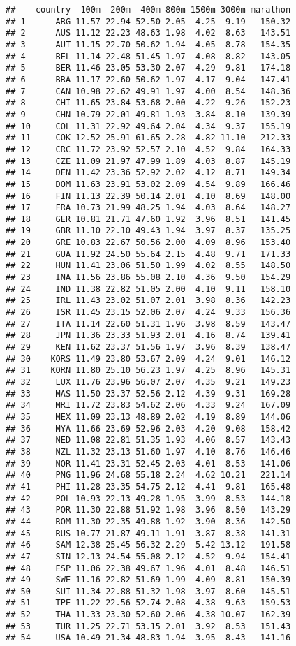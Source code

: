 \documentclass[]{article}
\begin{document}
\begin{verbatim}
##    country  100m  200m  400m 800m 1500m 3000m marathon
## 1      ARG 11.57 22.94 52.50 2.05  4.25  9.19   150.32
## 2      AUS 11.12 22.23 48.63 1.98  4.02  8.63   143.51
## 3      AUT 11.15 22.70 50.62 1.94  4.05  8.78   154.35
## 4      BEL 11.14 22.48 51.45 1.97  4.08  8.82   143.05
## 5      BER 11.46 23.05 53.30 2.07  4.29  9.81   174.18
## 6      BRA 11.17 22.60 50.62 1.97  4.17  9.04   147.41
## 7      CAN 10.98 22.62 49.91 1.97  4.00  8.54   148.36
## 8      CHI 11.65 23.84 53.68 2.00  4.22  9.26   152.23
## 9      CHN 10.79 22.01 49.81 1.93  3.84  8.10   139.39
## 10     COL 11.31 22.92 49.64 2.04  4.34  9.37   155.19
## 11     COK 12.52 25.91 61.65 2.28  4.82 11.10   212.33
## 12     CRC 11.72 23.92 52.57 2.10  4.52  9.84   164.33
## 13     CZE 11.09 21.97 47.99 1.89  4.03  8.87   145.19
## 14     DEN 11.42 23.36 52.92 2.02  4.12  8.71   149.34
## 15     DOM 11.63 23.91 53.02 2.09  4.54  9.89   166.46
## 16     FIN 11.13 22.39 50.14 2.01  4.10  8.69   148.00
## 17     FRA 10.73 21.99 48.25 1.94  4.03  8.64   148.27
## 18     GER 10.81 21.71 47.60 1.92  3.96  8.51   141.45
## 19     GBR 11.10 22.10 49.43 1.94  3.97  8.37   135.25
## 20     GRE 10.83 22.67 50.56 2.00  4.09  8.96   153.40
## 21     GUA 11.92 24.50 55.64 2.15  4.48  9.71   171.33
## 22     HUN 11.41 23.06 51.50 1.99  4.02  8.55   148.50
## 23     INA 11.56 23.86 55.08 2.10  4.36  9.50   154.29
## 24     IND 11.38 22.82 51.05 2.00  4.10  9.11   158.10
## 25     IRL 11.43 23.02 51.07 2.01  3.98  8.36   142.23
## 26     ISR 11.45 23.15 52.06 2.07  4.24  9.33   156.36
## 27     ITA 11.14 22.60 51.31 1.96  3.98  8.59   143.47
## 28     JPN 11.36 23.33 51.93 2.01  4.16  8.74   139.41
## 29     KEN 11.62 23.37 51.56 1.97  3.96  8.39   138.47
## 30    KORS 11.49 23.80 53.67 2.09  4.24  9.01   146.12
## 31    KORN 11.80 25.10 56.23 1.97  4.25  8.96   145.31
## 32     LUX 11.76 23.96 56.07 2.07  4.35  9.21   149.23
## 33     MAS 11.50 23.37 52.56 2.12  4.39  9.31   169.28
## 34     MRI 11.72 23.83 54.62 2.06  4.33  9.24   167.09
## 35     MEX 11.09 23.13 48.89 2.02  4.19  8.89   144.06
## 36     MYA 11.66 23.69 52.96 2.03  4.20  9.08   158.42
## 37     NED 11.08 22.81 51.35 1.93  4.06  8.57   143.43
## 38     NZL 11.32 23.13 51.60 1.97  4.10  8.76   146.46
## 39     NOR 11.41 23.31 52.45 2.03  4.01  8.53   141.06
## 40     PNG 11.96 24.68 55.18 2.24  4.62 10.21   221.14
## 41     PHI 11.28 23.35 54.75 2.12  4.41  9.81   165.48
## 42     POL 10.93 22.13 49.28 1.95  3.99  8.53   144.18
## 43     POR 11.30 22.88 51.92 1.98  3.96  8.50   143.29
## 44     ROM 11.30 22.35 49.88 1.92  3.90  8.36   142.50
## 45     RUS 10.77 21.87 49.11 1.91  3.87  8.38   141.31
## 46     SAM 12.38 25.45 56.32 2.29  5.42 13.12   191.58
## 47     SIN 12.13 24.54 55.08 2.12  4.52  9.94   154.41
## 48     ESP 11.06 22.38 49.67 1.96  4.01  8.48   146.51
## 49     SWE 11.16 22.82 51.69 1.99  4.09  8.81   150.39
## 50     SUI 11.34 22.88 51.32 1.98  3.97  8.60   145.51
## 51     TPE 11.22 22.56 52.74 2.08  4.38  9.63   159.53
## 52     THA 11.33 23.30 52.60 2.06  4.38 10.07   162.39
## 53     TUR 11.25 22.71 53.15 2.01  3.92  8.53   151.43
## 54     USA 10.49 21.34 48.83 1.94  3.95  8.43   141.16
\end{verbatim}
\end{document}
